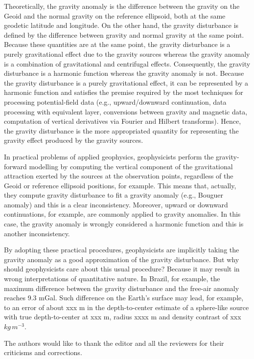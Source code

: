 \documentclass[extra]{gji}
\begin{document}
Theoretically, the gravity anomaly is the difference between the
gravity on the Geoid and the normal gravity on the reference ellipsoid,
both at the same geodetic latitude and longitude.
On the other hand, the gravity disturbance is defined by the difference
between gravity and normal gravity at the same point.
Because these quantities are at the same point, the gravity disturbance
is a purely gravitational effect due to the gravity sources whereas the
gravity anomaly is a combination of gravitational and centrifugal
effects.
Consequently, the gravity disturbance is a harmonic function whereas the
gravity anomaly is not.
Because the gravity disturbance is a purely gravitational effect, it can
be represented by a harmonic function and satisfies the premise required
by the most techniques for processing potential-field data (e.g.,
upward/downward continuation, data processing with equivalent layer,
conversions between gravity and magnetic data, computation of vertical
derivatives via Fourier and Hilbert transforms).
Hence, the gravity disturbance is the more appropriated quantity for
representing the gravity effect produced by the gravity sources.

In practical problems of applied geophysics, geophysicists perform the
gravity-forward modelling by computing the vertical component of the
gravitational attraction exerted by the sources at the observation
points, regardless of the Geoid or reference ellipsoid positions,
for example.
This means that, actually, they compute gravity disturbance to fit 
a gravity anomaly (e.g., Bouguer anomaly) and this is a clear inconsistency.
Moreover, upward or downward continuations, for example, are commonly applied to
gravity anomalies. In this case, the gravity anomaly is wrongly considered a
harmonic function and this is another inconsistency.

By adopting these practical procedures, geophysicists are implicitly
taking the gravity anomaly as a good approximation of the gravity
disturbance. But why should geophysicists care about this usual
procedure? Because it may result in wrong interpretations of
quantitative nature. In Brazil, for example, the maximum difference
between the gravity disturbance and the free-air anomaly reaches 9.3
mGal. Such difference on the Earth's surface may lead, for example, to
an error of about xxx m in the depth-to-center estimate of a sphere-like
source with true depth-to-center at xxx m, radius xxxx m and density
contrast of xxx $kg \, m^{-3}$.


\begin{acknowledgments}
The authors would like to thank the editor and all the
reviewers for their criticisms and corrections.
\end{acknowledgments}
\end{document}
